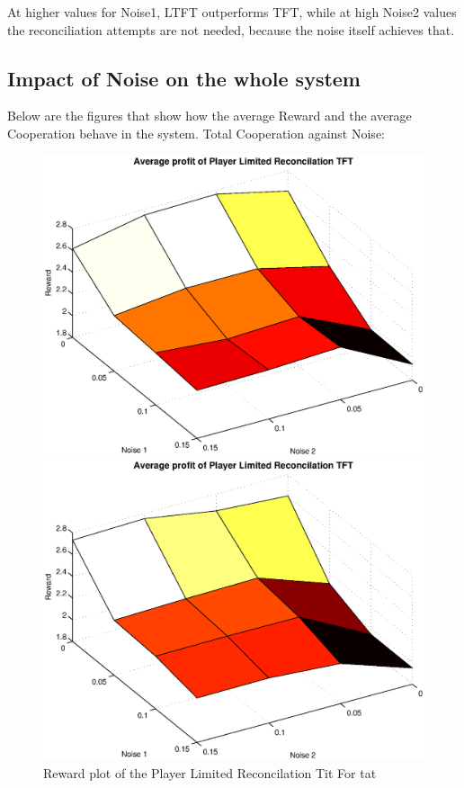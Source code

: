 At higher values for Noise1, LTFT outperforms TFT, while at high Noise2 values the reconciliation attempts are not needed, because the noise itself achieves that.

\subsection{Impact of Noise on the whole system}

Below are the figures that show how the average Reward and the average Cooperation behave in the system.
Total Cooperation against Noise:

\begin{figure}[h]

\begin{minipage}[hbt]{0.65\textwidth}
	\centering
	\includegraphics[width=\textwidth]{pics/simulation1/Reward_vs_Noise_of_Player_Limited_Reconcilation_TFT}
\end{minipage}
\hfill
\begin{minipage}[hbt]{0.3\textwidth}
	\centering
	\includegraphics[width=\textwidth]{pics/simulation2/Reward_vs_Noise_of_Player_Limited_Reconcilation_TFT}
\end{minipage}
	\caption{Reward plot of the Player Limited Reconcilation Tit For tat}
	\label{pic player lrtft}
\end{figure}

